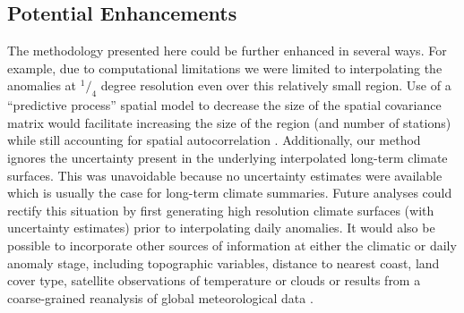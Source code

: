 \documentclass[12pt]{article}
\begin{document}
\subsection{Potential Enhancements}
The methodology presented here could be further enhanced in several
ways. For example, due to computational limitations we were limited to
interpolating the anomalies at $^1/_4$ degree resolution even over
this relatively small region.  Use of a ``predictive process'' spatial
model \citep{banerjee_gaussian_2008}
to decrease the size of the spatial covariance matrix would facilitate
increasing the size of the region (and number of stations) while still
accounting for spatial autocorrelation \citep{chakraborty_point_2011}.  
Additionally, our method ignores the uncertainty present in the underlying
interpolated long-term climate surfaces.  This was unavoidable because
no uncertainty estimates were available \citep{schulze_south_2007} which is usually the case for long-term climate summaries.
Future analyses could rectify this situation by first generating high
resolution climate surfaces (with uncertainty estimates) prior to
interpolating daily anomalies.  It would also be possible to
incorporate other sources of information at either the
climatic or daily anomaly stage, including topographic variables, distance to nearest coast, land cover type, satellite observations of temperature or clouds \citep[\textit{e.g.}][]{alvarez-villa_improved_2011,hart_daily_2009} or results from a
coarse-grained reanalysis of global meteorological data
\citep[\textit{e.g}][]{compo_twentieth_2011}.  
\end{document}
